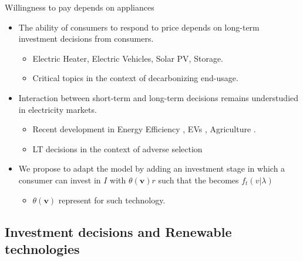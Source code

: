 \documentclass{class}
\begin{document}
\begin{frame}{Willingness to pay depends on appliances}

\begin{itemize}
    \item The ability of consumers to respond to price depends on long-term investment decisions from consumers.
    \begin{itemize}
        \item Electric Heater, Electric Vehicles, Solar PV, Storage. 
        \item Critical topics in the context of decarbonizing end-usage.
    \end{itemize}

    \vfill   
    
    \item Interaction between short-term and long-term decisions remains understudied in electricity markets.\cite{Buchsbaum2023}
    \begin{itemize}
        \item Recent development in Energy Efficiency \cite{Allcott2014}, EVs \cite{NBERw29842}, Agriculture \cite{Burlig2024}.
        \item LT decisions in the context of adverse selection \cite{Einav2021}
    \end{itemize}

    \vfill
    
    \item We propose to adapt the model by adding an investment stage in which a consumer can invest in  $I$ with  $\theta(\textbf{v})r$ such that the  becomes $f_t(v|\lambda)$
    \begin{itemize}
        \item $\theta(\textbf{v})$ represent  for such technology.
    \end{itemize}
\end{itemize}

    
\end{frame}


\subsection{Investment decisions and Renewable technologies}
\end{document}
